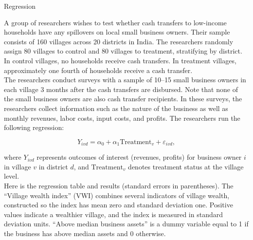 \begin{homeworkProblem}{Regression}
    
    A group of researchers wishes to test whether cash transfers to low-income 
    households have any spillovers on local small business owners. Their 
    sample consists of 160 villages across 20 districts in India. The 
    researchers randomly assign 80 villages to control and 80 villages to 
    treatment, stratifying by district. In control villages, no households 
    receive cash transfers. In treatment villages, approximately one fourth 
    of households receive a cash transfer. \\

    The researchers conduct surveys with a sample of 10–15 small business 
    owners in each village 3 months after the cash transfers are disbursed. 
    Note that none of the small business owners are also cash transfer 
    recipients. In these surveys, the researchers collect information such 
    as the nature of the business as well as monthly revenues, labor costs, 
    input costs, and profits. The researchers run the following regression:

    \[
        Y_{ivd} = \alpha_0 + \alpha_1 \text{Treatment}_{v} + \varepsilon_{ivd},
    \]

    where $Y_{ivd}$ represents outcomes of interest (revenues, profits) for 
    business owner $i$ in village $v$ in district $d$, and $\text{Treatment}_v$ 
    denotes treatment status at the village level. \\

    Here is the regression table and results (standard errors in parentheses). 
    The ``Village wealth index'' (VWI) combines several indicators of village 
    wealth, constructed so the index has mean zero and standard deviation one. 
    Positive values indicate a wealthier village, and the index is measured in 
    standard deviation units. ``Above median business assets'' is a dummy 
    variable equal to 1 if the business has above median assets and 0 
    otherwise.


\end{homeworkProblem}
